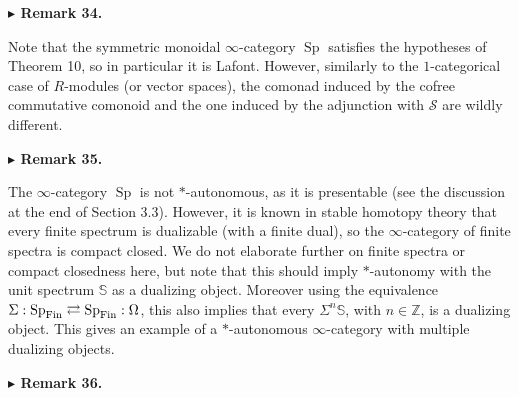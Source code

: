  
 
 
\par\medskip\noindent\textbf{$\blacktriangleright$ Remark 34.}\par
 
 
Note that the symmetric monoidal $\infty$-category $\operatorname{Sp}$ satisfies the hypotheses of Theorem 10, so in particular it is Lafont. However, similarly to the $1$-categorical case of $R$-modules (or vector spaces), the comonad induced by the cofree commutative comonoid and the one induced by the adjunction with ${\mathcal{S}}$ are wildly different.\par
 
 
 
 
\par\medskip\noindent\textbf{$\blacktriangleright$ Remark 35.}\par
 
 
The $\infty$-category $\operatorname{Sp}$ is not $\ast$-autonomous, as it is presentable (see the discussion at the end of Section 3.3). However, it is known in stable homotopy theory that every finite spectrum is dualizable (with a finite dual), so the $\infty$-category of finite spectra is compact closed. We do not elaborate further on finite spectra or compact closedness here, but note that this should imply $\ast$-autonomy with the unit spectrum $\mathbb{S}$ as a dualizing object. Moreover using the equivalence $\Sigma:\operatorname{Sp}_{\textnormal{Fin}}\rightleftarrows\operatorname{Sp}_{\textnormal{Fin}}:\Omega$, this also implies that every $\Sigma^{n}\mathbb{S}$, with $n\in\mathbb{Z}$, is a dualizing object. This gives an example of a $\ast$-autonomous $\infty$-category with multiple dualizing objects.\par
 
 
 
 
\par\medskip\noindent\textbf{$\blacktriangleright$ Remark 36.}\par
 
